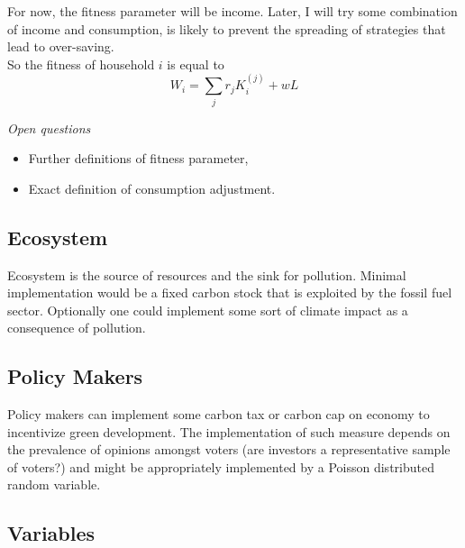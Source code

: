 For now, the fitness parameter will be income. Later, I will try some combination of income and consumption, is likely to prevent the spreading of strategies that lead to over-saving.\\
So the fitness of household $i$ is equal to
\begin{equation}
	W_i = \sum_j r_j K^{(j)}_{i} + wL
	\label{eq:fitness}
\end{equation}

\textit{Open questions}
\begin{itemize}
	\item Further definitions of fitness parameter,
	\item Exact definition of consumption adjustment.
\end{itemize}

\subsection{Ecosystem}
Ecosystem is the source of resources and the sink for pollution. Minimal implementation would be a fixed carbon stock that is exploited by the fossil fuel sector. Optionally one could implement some sort of climate impact as a consequence of pollution.

\subsection{Policy Makers}
Policy makers can implement some carbon tax or carbon cap on economy to incentivize green development. The implementation of such measure depends on the prevalence of opinions amongst voters (are investors a representative sample of voters?) and might be appropriately implemented by a Poisson distributed random variable.

\subsection{Variables}

